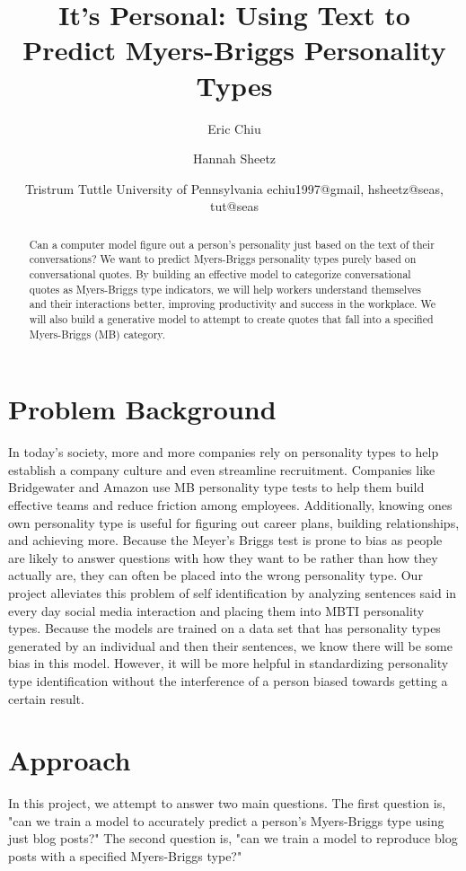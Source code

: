 \documentclass{article}
\title{It's Personal: Using Text to Predict Myers-Briggs Personality Types}
\author{
Eric Chiu\and
Hannah Sheetz\and
Tristrum Tuttle
\affiliations
University of Pennsylvania
\emails
echiu1997@gmail, hsheetz@seas, tut@seas
}
\begin{document}
\maketitle

\begin{abstract}
Can a computer model figure out a person's personality just based on the text of their conversations? We want to predict Myers-Briggs personality types purely based on conversational quotes. By building an effective model to categorize conversational quotes as Myers-Briggs type indicators, we will help workers understand themselves and their interactions better, improving productivity and success in the workplace. We will also build a generative model to attempt to create quotes that fall into a specified Myers-Briggs (MB) category.
\end{abstract}

\section{Problem Background}
In today's society, more and more companies rely on personality types to help establish a company culture and even streamline recruitment. Companies like Bridgewater and Amazon use MB personality type tests to help them build effective teams and reduce friction among employees. Additionally, knowing ones own personality type is useful for figuring out career plans, building relationships, and achieving more. Because the Meyer's Briggs test is prone to bias as people are likely to answer questions with how they want to be rather than how they actually are, they can often be placed into the wrong personality type. Our project alleviates this problem of self identification by analyzing sentences said in every day social media interaction and placing them into MBTI personality types. Because the models are trained on a data set that has personality types generated by an individual and then their sentences, we know there will be some bias in this model. However, it will be more helpful in standardizing personality type identification without the interference of a person biased towards getting a certain result. 

\section{Approach}
In this project, we attempt to answer two main questions. The first question is, "can we train a model to accurately predict a person's Myers-Briggs type using just blog posts?" The second question is, "can we train a model to reproduce blog posts with a specified Myers-Briggs type?" 
\end{document}

